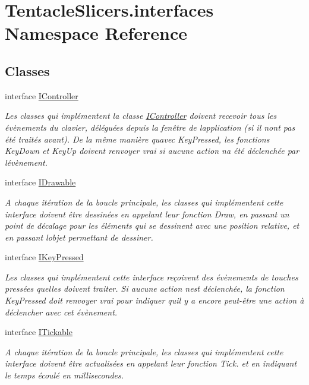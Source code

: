 \hypertarget{namespace_tentacle_slicers_1_1interfaces}{}\section{Tentacle\+Slicers.\+interfaces Namespace Reference}
\label{namespace_tentacle_slicers_1_1interfaces}
\subsection*{Classes}
\begin{DoxyCompactItemize}
\item 
interface \hyperlink{interface_tentacle_slicers_1_1interfaces_1_1_i_controller}{I\+Controller}
\begin{DoxyCompactList}\small\item\em Les classes qui implémentent la classe \hyperlink{interface_tentacle_slicers_1_1interfaces_1_1_i_controller}{I\+Controller} doivent recevoir tous les évènements du clavier, déléguées depuis la fenêtre de l\textquotesingle{}application (si il n\textquotesingle{}ont pas été traités avant). De la même manière qu\textquotesingle{}avec Key\+Pressed, les fonctions Key\+Down et Key\+Up doivent renvoyer vrai si aucune action n\textquotesingle{}a été déclenchée par l\textquotesingle{}évènement. \end{DoxyCompactList}\item 
interface \hyperlink{interface_tentacle_slicers_1_1interfaces_1_1_i_drawable}{I\+Drawable}
\begin{DoxyCompactList}\small\item\em A chaque itération de la boucle principale, les classes qui implémentent cette interface doivent être dessinées en appelant leur fonction Draw, en passant un point de décalage pour les éléments qui se dessinent avec une position relative, et en passant l\textquotesingle{}objet permettant de dessiner. \end{DoxyCompactList}\item 
interface \hyperlink{interface_tentacle_slicers_1_1interfaces_1_1_i_key_pressed}{I\+Key\+Pressed}
\begin{DoxyCompactList}\small\item\em Les classes qui implémentent cette interface reçoivent des évènements de touches pressées qu\textquotesingle{}elles doivent traiter. Si aucune action n\textquotesingle{}est déclenchée, la fonction Key\+Pressed doit renvoyer vrai pour indiquer qu\textquotesingle{}il y a encore peut-\/être une action à déclencher avec cet évènement. \end{DoxyCompactList}\item 
interface \hyperlink{interface_tentacle_slicers_1_1interfaces_1_1_i_tickable}{I\+Tickable}
\begin{DoxyCompactList}\small\item\em A chaque itération de la boucle principale, les classes qui implémentent cette interface doivent être actualisées en appelant leur fonction Tick. et en indiquant le temps écoulé en millisecondes. \end{DoxyCompactList}\end{DoxyCompactItemize}
